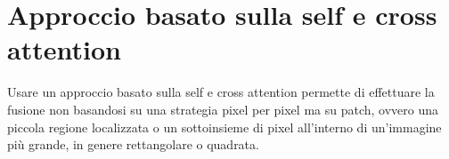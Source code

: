 

\chapter{Approccio basato sulla self e cross attention}
Usare un approccio basato sulla self e cross attention permette di effettuare la fusione non basandosi su una strategia 
pixel per pixel ma su patch, ovvero 
una piccola regione localizzata o un sottoinsieme di pixel all'interno di 
un'immagine più grande, in genere rettangolare o quadrata. 
